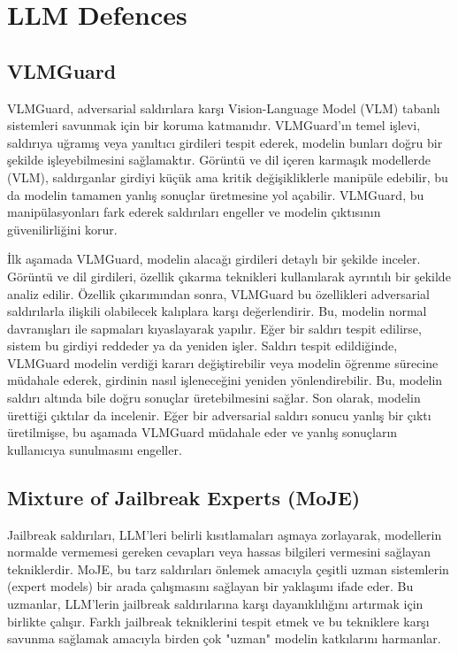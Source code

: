 \section{LLM Defences}

\subsection{VLMGuard}

VLMGuard, adversarial saldırılara karşı Vision-Language Model (VLM) tabanlı sistemleri savunmak için bir koruma katmanıdır. VLMGuard’ın temel işlevi, saldırıya uğramış veya yanıltıcı girdileri tespit ederek, modelin bunları doğru bir şekilde işleyebilmesini sağlamaktır. Görüntü ve dil içeren karmaşık modellerde (VLM), saldırganlar girdiyi küçük ama kritik değişikliklerle manipüle edebilir, bu da modelin tamamen yanlış sonuçlar üretmesine yol açabilir. VLMGuard, bu manipülasyonları fark ederek saldırıları engeller ve modelin çıktısının güvenilirliğini korur.

İlk aşamada VLMGuard, modelin alacağı girdileri detaylı bir şekilde inceler. Görüntü ve dil girdileri, özellik çıkarma teknikleri kullanılarak ayrıntılı bir şekilde analiz edilir. Özellik çıkarımından sonra, VLMGuard bu özellikleri adversarial saldırılarla ilişkili olabilecek kalıplara karşı değerlendirir. Bu, modelin normal davranışları ile sapmaları kıyaslayarak yapılır. Eğer bir saldırı tespit edilirse, sistem bu girdiyi reddeder ya da yeniden işler. Saldırı tespit edildiğinde, VLMGuard modelin verdiği kararı değiştirebilir veya modelin öğrenme sürecine müdahale ederek, girdinin nasıl işleneceğini yeniden yönlendirebilir. Bu, modelin saldırı altında bile doğru sonuçlar üretebilmesini sağlar. Son olarak, modelin ürettiği çıktılar da incelenir. Eğer bir adversarial saldırı sonucu yanlış bir çıktı üretilmişse, bu aşamada VLMGuard müdahale eder ve yanlış sonuçların kullanıcıya sunulmasını engeller.

\newpage

\subsection{Mixture of Jailbreak Experts (MoJE)}

Jailbreak saldırıları, LLM'leri belirli kısıtlamaları aşmaya zorlayarak, modellerin normalde vermemesi gereken cevapları veya hassas bilgileri vermesini sağlayan tekniklerdir. MoJE, bu tarz saldırıları önlemek amacıyla çeşitli uzman sistemlerin (expert models) bir arada çalışmasını sağlayan bir yaklaşımı ifade eder. Bu uzmanlar, LLM’lerin jailbreak saldırılarına karşı dayanıklılığını artırmak için birlikte çalışır. Farklı jailbreak tekniklerini tespit etmek ve bu tekniklere karşı savunma sağlamak amacıyla birden çok "uzman" modelin katkılarını harmanlar.

